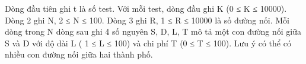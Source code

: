 Dòng đầu tiên ghi t là số test. Với mỗi test, dòng đầu ghi K (0 ≤ K ≤ 10000). Dòng 2 ghi N, 2 ≤ N ≤ 100. Dòng 3 ghi R, 1 ≤ R ≤ 10000 là số đường nối. Mỗi dòng trong N dòng sau ghi 4 số nguyên S, D, L, T mô tả một con đường nối giữa S và D với độ dài L ( 1 ≤ L ≤ 100) và chi phí T (0 ≤ T ≤ 100). Lưu ý có thể có nhiều con đường nối giữa hai thành phố.  

\